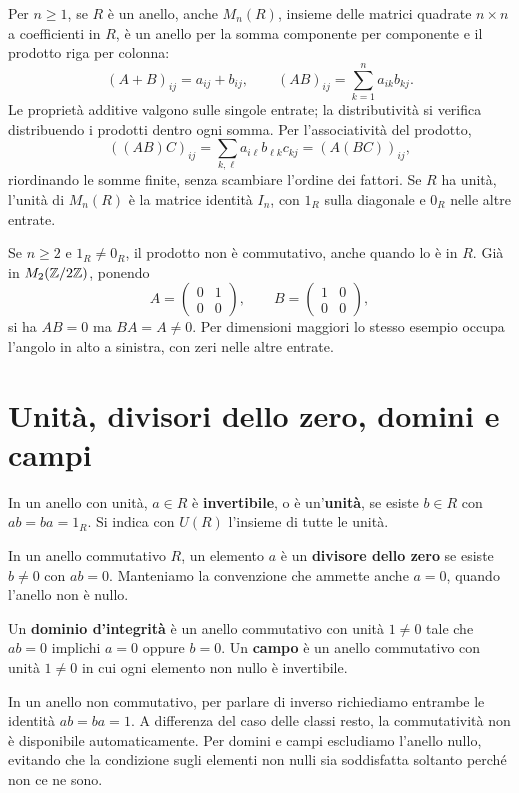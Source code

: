 \begin{esempio}
Per $n\ge1$, se $R$ è un anello, anche $M_n(R)$, insieme delle matrici quadrate $n\times n$ a coefficienti in $R$, è un anello per la somma componente per componente e il prodotto riga per colonna:
\[
(A+B)_{ij}=a_{ij}+b_{ij},\qquad(AB)_{ij}=\sum_{k=1}^n a_{ik}b_{kj}.
\]
Le proprietà additive valgono sulle singole entrate; la distributività si verifica distribuendo i prodotti dentro ogni somma. Per l'associatività del prodotto,
\[
((AB)C)_{ij}=\sum_{k,\ell}a_{i\ell}b_{\ell k}c_{kj}
            =(A(BC))_{ij},
\]
riordinando le somme finite, senza scambiare l'ordine dei fattori. Se $R$ ha unità, l'unità di $M_n(R)$ è la matrice identità $I_n$, con $1_R$ sulla diagonale e $0_R$ nelle altre entrate.

Se $n\ge2$ e $1_R\ne0_R$, il prodotto non è commutativo, anche quando lo è in $R$. Già in $M_2(\mathbb{Z}/2\mathbb{Z})$, ponendo
\[
A=\begin{pmatrix}0&1\\0&0\end{pmatrix},\qquad
B=\begin{pmatrix}1&0\\0&0\end{pmatrix},
\]
si ha $AB=0$ ma $BA=A\ne0$. Per dimensioni maggiori lo stesso esempio occupa l'angolo in alto a sinistra, con zeri nelle altre entrate.
\end{esempio}

\section{Unità, divisori dello zero, domini e campi}
\begin{definizione}
In un anello con unità, $a\in R$ è \textbf{invertibile}, o è un'\textbf{unità}, se esiste $b\in R$ con $ab=ba=1_R$. Si indica con $U(R)$ l'insieme di tutte le unità.

In un anello commutativo $R$, un elemento $a$ è un \textbf{divisore dello zero} se esiste $b\ne0$ con $ab=0$. Manteniamo la convenzione che ammette anche $a=0$, quando l'anello non è nullo.

Un \textbf{dominio d'integrità} è un anello commutativo con unità $1\ne0$ tale che $ab=0$ implichi $a=0$ oppure $b=0$. Un \textbf{campo} è un anello commutativo con unità $1\ne0$ in cui ogni elemento non nullo è invertibile.
\end{definizione}

\begin{osservazione}
In un anello non commutativo, per parlare di inverso richiediamo entrambe le identità $ab=ba=1$. A differenza del caso delle classi resto, la commutatività non è disponibile automaticamente. Per domini e campi escludiamo l'anello nullo, evitando che la condizione sugli elementi non nulli sia soddisfatta soltanto perché non ce ne sono.
\end{osservazione}

